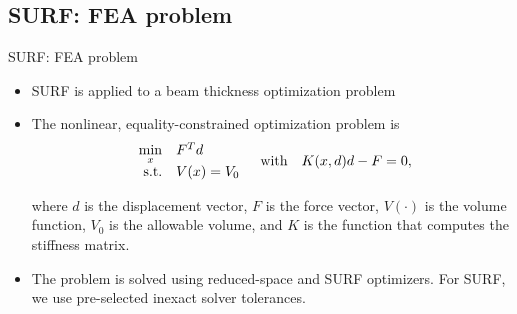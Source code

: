\documentclass{beamer}
\begin{document}
\subsection{SURF: FEA problem}
  \begin{frame}{SURF: FEA problem}
      \begin{itemize}
        \item SURF is applied to a beam thickness optimization problem
      
        \item The nonlinear, equality-constrained optimization problem is
          \begin{equation*} %
              \begin{array}{r l}
                  \min\limits_{x} & F^T d \\
                  \text{s.t.}
                  & V(x) = V_0 \\
              \end{array}
              \quad \text{with} \quad
              K(x, d) d - F = 0,
          \end{equation*}
   
        where $d$ is the displacement vector, $F$ is the force vector, $V(\cdot)$ is the volume function, $V_0$ is the allowable volume, and $K$ is the function that computes the stiffness matrix.
    
        
        \item The problem is solved using reduced-space and SURF optimizers.
        For SURF, we use pre-selected inexact solver tolerances.
    \end{itemize}
  \end{frame}
\end{document}
